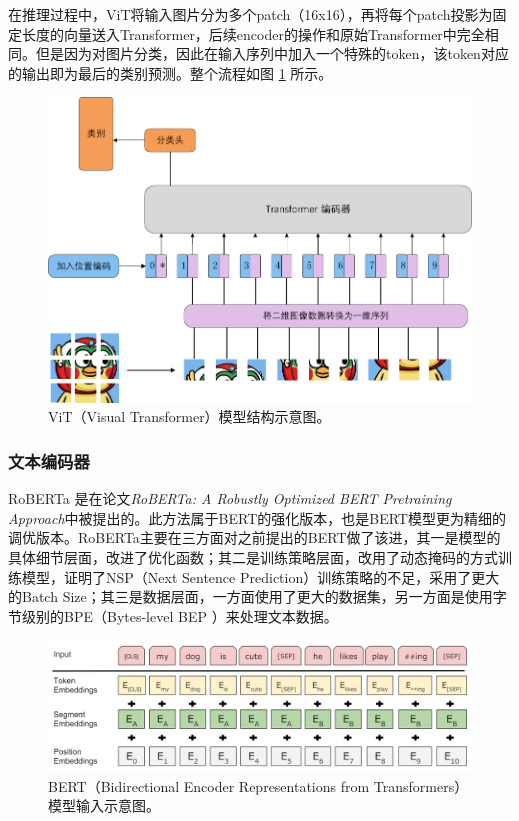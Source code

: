 \documentclass[a4paper]{zreport}
\begin{document}
在推理过程中，ViT将输入图片分为多个patch（16x16），再将每个patch投影为固定长度的向量送入Transformer，后续encoder的操作和原始Transformer中完全相同。但是因为对图片分类，因此在输入序列中加入一个特殊的token，该token对应的输出即为最后的类别预测。整个流程如图 \ref{fig:vit} 所示。

\begin{figure}[h]
\centering
\includegraphics[width=0.9\linewidth]{figures/vit}
\caption{ViT（Visual Transformer）模型结构示意图。}
\label{fig:vit}
\end{figure}

\subsubsection{文本编码器}

RoBERTa \cite{roberta} 是在论文\emph{RoBERTa: A Robustly Optimized BERT Pretraining Approach}中被提出的。此方法属于BERT的强化版本，也是BERT模型更为精细的调优版本。RoBERTa主要在三方面对之前提出的BERT做了该进，其一是模型的具体细节层面，改进了优化函数；其二是训练策略层面，改用了动态掩码的方式训练模型，证明了NSP（Next Sentence Prediction）训练策略的不足，采用了更大的Batch Size；其三是数据层面，一方面使用了更大的数据集，另一方面是使用字节级别的BPE（Bytes-level BEP ）来处理文本数据。

\begin{figure}[h]
\centering
\includegraphics[width=\linewidth]{figures/bert1}
\caption{BERT（Bidirectional Encoder Representations from Transformers）模型输入示意图。}
\label{fig:bert1}
\end{figure}
\end{document}

